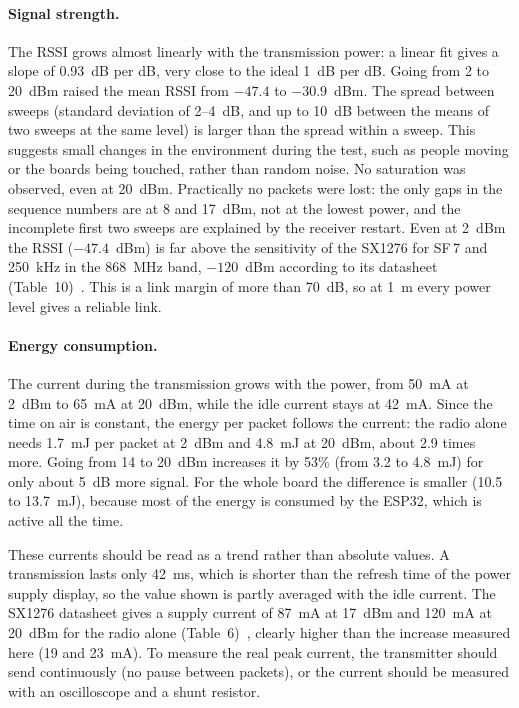 \documentclass[informe,english]{plantilla}
\begin{document}
\paragraph{Signal strength.} The RSSI grows almost linearly with the
transmission power: a linear fit gives a slope of 0.93~dB per dB, very close
to the ideal 1~dB per dB. Going from 2 to 20~dBm raised the mean RSSI from
$-47.4$ to $-30.9$~dBm. The spread between sweeps (standard deviation of
2--4~dB, and up to 10~dB between the means of two sweeps at the same level) is
larger than the spread within a sweep. This suggests small changes in the
environment during the test, such as people moving or the boards being
touched, rather than random noise. No saturation was observed, even at
20~dBm. Practically no packets were lost: the only gaps in the sequence
numbers are at 8 and 17~dBm, not at the lowest power, and the incomplete
first two sweeps are explained by the receiver restart. Even at 2~dBm the RSSI
($-47.4$~dBm) is far above the sensitivity of the SX1276 for SF\,7 and
250~kHz in the 868~MHz band, $-120$~dBm according to its datasheet
(Table~10)~\cite{sx1276}. This is a link margin of more than 70~dB, so at
1~m every power level gives a reliable link.

\paragraph{Energy consumption.} The current during the transmission grows
with the power, from 50~mA at 2~dBm to 65~mA at 20~dBm, while the idle current stays at 42~mA. Since the time on air is constant, the energy per packet
follows the current: the radio alone needs 1.7~mJ per packet at 2~dBm and
4.8~mJ at 20~dBm, about 2.9 times more. Going from 14 to 20~dBm increases it
by 53\% (from 3.2 to 4.8~mJ) for only about 5~dB more signal. For the whole
board the difference is smaller (10.5 to 13.7~mJ), because most of the energy
is consumed by the ESP32, which is active all the time.

These currents should be read as a trend rather than absolute values. A
transmission lasts only 42~ms, which is shorter than the refresh time of the
power supply display, so the value shown is partly averaged with the idle
current. The SX1276 datasheet gives a supply current of 87~mA at
17~dBm and 120~mA at 20~dBm for the radio alone (Table~6)~\cite{sx1276}, clearly higher than the
increase measured here (19 and 23~mA). To measure the real peak current,
the transmitter should send continuously (no pause between packets), or the
current should be measured with an oscilloscope and a shunt resistor.
\end{document}
